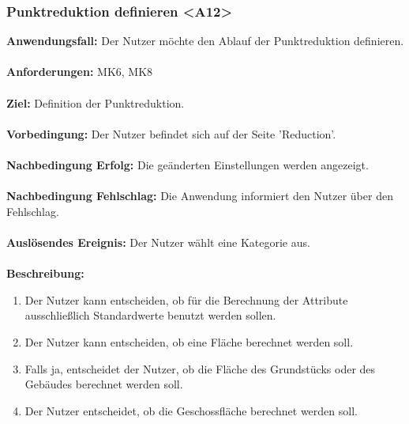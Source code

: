\documentclass[parskip=full]{scrartcl} %
\begin{document}
\subsubsection*{Punktreduktion definieren <A12>}
\textbf{Anwendungsfall:} Der Nutzer möchte den Ablauf der Punktreduktion definieren.\\\\
\textbf{Anforderungen:} MK6, MK8\\\\
\textbf{Ziel:} Definition der Punktreduktion. \\\\
\textbf{Vorbedingung:} Der Nutzer befindet sich auf der Seite 'Reduction'.\\\\
\textbf{Nachbedingung Erfolg:} Die geänderten Einstellungen werden angezeigt. \\\\
\textbf{Nachbedingung Fehlschlag:} Die Anwendung informiert den Nutzer über den Fehlschlag. \\\\
\textbf{Auslösendes Ereignis:} Der Nutzer wählt eine Kategorie aus. \\\\
\textbf{Beschreibung:}
\begin{enumerate}
    \item Der Nutzer kann entscheiden, ob für die Berechnung der Attribute ausschließlich Standardwerte benutzt werden sollen.
    \item Der Nutzer kann entscheiden, ob eine Fläche berechnet werden soll.
    \item Falls ja, entscheidet der Nutzer, ob die Fläche des Grundstücks oder des Gebäudes berechnet werden soll.
    \item Der Nutzer entscheidet, ob die Geschossfläche berechnet werden soll.
\end{enumerate}
\newpage
\end{document}
